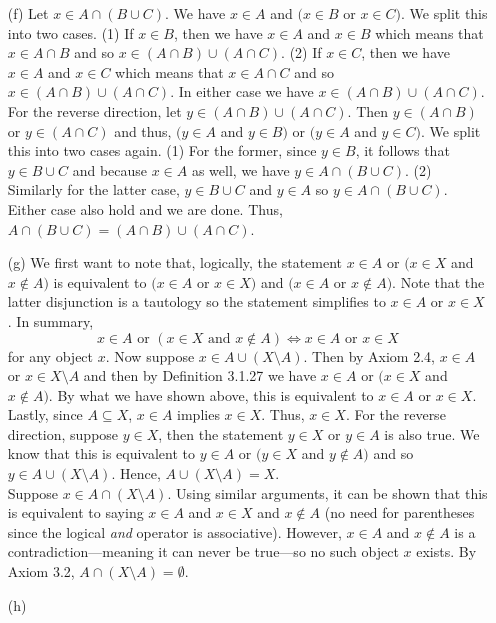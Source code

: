 \documentclass{amsart}
\theoremstyle{definition}
\begin{document}
\begin{enumerate}
\item[(f)] Let $x\in A\cap(B\cup C)$. We have $x\in A$ and $(x\in B$ or $x\in C)$. We split this into two cases. (1) If $x\in B$, then we have $x\in A$ and $x\in B$ which means that $x\in A\cap B$ and so $x\in (A\cap B)\cup(A\cap C)$. (2) If $x\in C$, then we have $x\in A$ and $x\in C$ which means that $x\in A\cap C$ and so $x\in (A\cap B)\cup(A\cap C)$. In either case we have $x\in (A\cap B)\cup(A\cap C)$. For the reverse direction, let $y\in (A\cap B)\cup(A\cap C)$. Then $y\in (A\cap B)$ or $y\in(A\cap C)$ and thus, $(y\in A$ and $y\in B)$ or $(y\in A$ and $y\in C)$. We split this into two cases again. (1) For the former, since $y\in B$, it follows that $y\in B\cup C$ and because $x\in A$ as well, we have $y\in A\cap(B\cup C)$. (2) Similarly for the latter case, $y\in B\cup C$ and $y\in A$ so $y\in A\cap(B\cup C)$. Either case also hold and we are done. Thus, $A\cap(B\cup C)=(A\cap B)\cup(A\cap C)$. \\
\item[(g)] We first want to note that, logically, the statement $x\in A$ or $(x\in X$ and $x\notin A)$ is equivalent to $(x\in A$ or $x\in X)$ and $(x\in A$ or $x\notin A)$. Note that the latter disjunction is a tautology so the statement simplifies to $x\in A$ or $x\in X$. In summary, 
\[
x\in A \text{ or } (x\in X \text{ and }  x\notin A) \iff  x\in A \text{ or } x\in X
\]
for any object $x$. Now suppose $x\in A\cup(X\setminus A)$. Then by Axiom 2.4, $x\in A$ or $x\in X\setminus A$ and then by Definition 3.1.27 we have $x\in A$ or $(x\in X$ and $x\notin A)$. By what we have shown above, this is equivalent to $x\in A$ or $x\in X$. Lastly, since $A\subseteq X$, $x\in A$ implies $x\in X$. Thus, $x\in X$. For the reverse direction, suppose $y\in X$, then the statement $y\in X$ or $y\in A$ is also true. We know that this is equivalent to $y\in A$ or $(y\in X$ and $y\notin A)$ and so $y\in A\cup(X\setminus A)$. Hence, $A\cup(X\setminus A)=X$. \\

\noindent Suppose $x\in A\cap(X\setminus A)$. Using similar arguments, it can be shown that this is equivalent to saying $x\in A$ and $x\in X$ and $x\notin A$ (no need for parentheses since the logical \textit{and} operator is associative). However, $x\in A$ and $x\notin A$ is a contradiction---meaning it can never be true---so no such object $x$ exists. By Axiom 3.2, $A\cap(X\setminus A)=\emptyset$. \\
\item[(h)] 
\end{enumerate}
\end{document}
